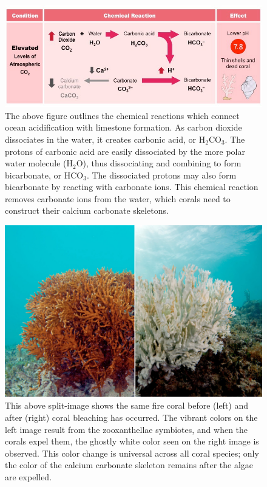 \documentclass{book}\usepackage{knitr}
\begin{document}
\begin{figure}
\includegraphics[width=\linewidth]{images/acidification2_med}
\caption{The above figure outlines the chemical reactions which connect ocean acidification with limestone formation. As carbon dioxide dissociates in the water, it creates carbonic acid, or H$_2$CO$_3$. The protons of carbonic acid are easily dissociated by the more polar water molecule (H$_2$O), thus dissociating and combining to form bicarbonate, or HCO$_3$. The dissociated protons may also form bicarbonate by reacting with carbonate ions. This chemical reaction removes carbonate ions from the water, which corals need to construct their calcium carbonate skeletons.}
\label{fig:Ocean Acidifcation Chemical Reaction and Its Carbonate Relation}
\end{figure}

\begin{figure}
\includegraphics[width=\linewidth]{images/coralbleach}
\caption{This above split-image shows the same fire coral before (left) and after (right) coral bleaching has occurred. The vibrant colors on the left image result from the zooxanthellae symbiotes, and when the corals expel them, the ghostly white color seen on the right image is observed. This color change is universal across all coral species; only the color of the calcium carbonate skeleton remains after the algae are expelled.}
\label{fig:Coral Bleaching}
\end{figure}
\end{document}
